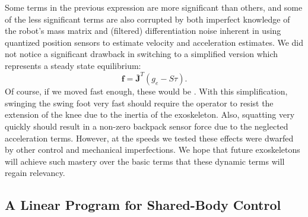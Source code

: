 Some terms in the previous expression are more significant than others, and some of the less significant terms are also corrupted by both imperfect knowledge of the robot's mass matrix and (filtered) differentiation noise inherent in using quantized position sensors to estimate velocity and acceleration estimates. We did not notice a significant drawback in switching to a simplified version which represents a steady state equilibrium:
\begin{equation}
{\mathbf f} = {\bar{\mathbf{J}}^T} (g_e - S\tau). \label{eq:static_equilibrium}
\end{equation}
Of course, if we moved fast enough, these  would be . With this simplification, swinging the swing foot very fast should require the operator to resist the  extension of the knee due to the inertia of the exoskeleton. Also, squatting very quickly should result in a non-zero backpack sensor force due to the neglected acceleration terms. However, at the speeds we tested these effects were dwarfed by other control and mechanical imperfections. We hope that future exoskeletons will achieve such mastery over the basic terms that these dynamic terms will regain relevancy.

\subsection{A Linear Program for Shared-Body Control}


